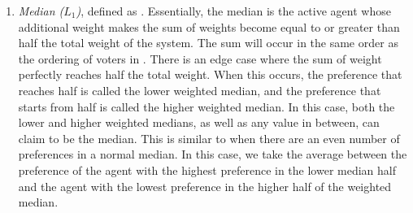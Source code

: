 \begin{enumerate}
    \item {
        \textit{Median ($L_1$)}, defined as
        $$.
%
%
%
        Essentially, the median is the active agent whose additional weight makes the
        sum of weights become equal to or greater than half the total weight of the
        system.
        The sum will occur in the same order as the ordering of voters in
        \systemproxies.
        There is an edge case where the sum of weight perfectly reaches half the
        total weight.
        When this occurs, the preference that reaches half is called the lower
        weighted median, and the preference that starts from half is called the higher
        weighted median.
        In this case, both the lower and higher weighted medians,
        as well as any value in between, can claim to be the median.
        This is similar to when there are an even number of preferences in a normal
        median.
        In this case, we take the average between the preference of the agent with
        the highest preference in the lower median half and the agent with the lowest
        preference in the higher half of the weighted median.
    }

\end{enumerate}
